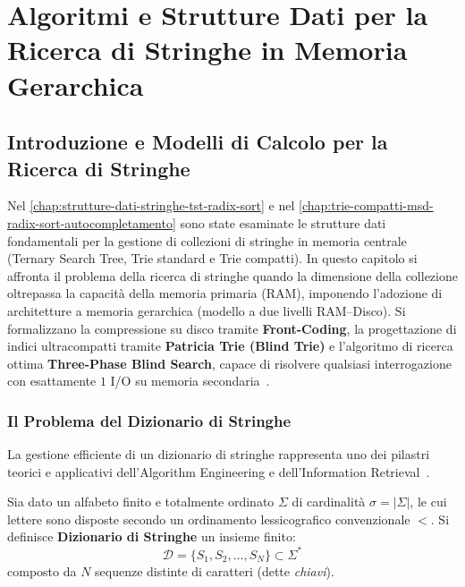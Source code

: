 \chapter{Algoritmi e Strutture Dati per la Ricerca di Stringhe in Memoria Gerarchica}
\label{chap:ricerca-stringhe-memoria-gerarchica}

\FloatBarrier
\section{Introduzione e Modelli di Calcolo per la Ricerca di Stringhe}
\label{sec:intro-modelli-calcolo-stringhe}

Nel \autoref{chap:strutture-dati-stringhe-tst-radix-sort} e nel \autoref{chap:trie-compatti-msd-radix-sort-autocompletamento} sono state esaminate le strutture dati fondamentali per la gestione di collezioni di stringhe in memoria centrale (Ternary Search Tree, Trie standard e Trie compatti). In questo capitolo si affronta il problema della ricerca di stringhe quando la dimensione della collezione oltrepassa la capacit\`a della memoria primaria (RAM), imponendo l'adozione di architetture a memoria gerarchica (modello a due livelli RAM--Disco). Si formalizzano la compressione su disco tramite \textbf{Front-Coding}, la progettazione di indici ultracompatti tramite \textbf{Patricia Trie (Blind Trie)} e l'algoritmo di ricerca ottima \textbf{Three-Phase Blind Search}, capace di risolvere qualsiasi interrogazione con esattamente $1$ I/O su memoria secondaria~\cite{aggarwal1988,ferragina1999}.

\FloatBarrier
\subsection{Il Problema del Dizionario di Stringhe}
\label{subsec:problema-dizionario-stringhe}

La gestione efficiente di un dizionario di stringhe rappresenta uno dei pilastri teorici e applicativi dell'Algorithm Engineering e dell'Information Retrieval~\cite{manning2008}.

\begin{definition}
Sia dato un alfabeto finito e totalmente ordinato $\Sigma$ di cardinalit\`a $\sigma = |\Sigma|$, le cui lettere sono disposte secondo un ordinamento lessicografico convenzionale $<$. Si definisce \textbf{Dizionario di Stringhe} un insieme finito:
\begin{equation}
  \mathcal{D} = \{S_1, S_2, \dots, S_N\} \subset \Sigma^*
\end{equation}
composto da $N$ sequenze distinte di caratteri (dette \textit{chiavi}).
\end{definition}

